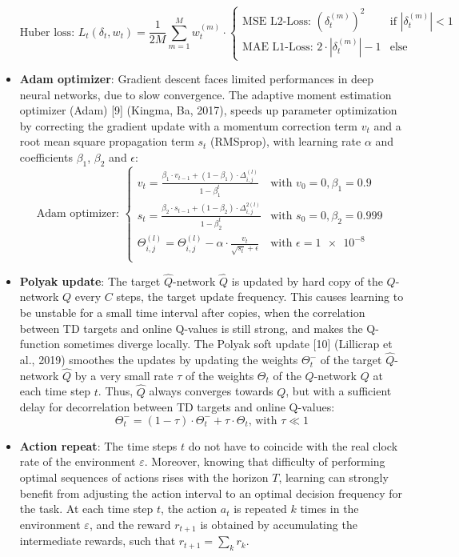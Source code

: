 \begin{itemize}
  \[ 
  \text{Huber loss: } L_t(\delta_t, w_t) = \frac{1}{2M}\sum_{m=1}^M w_t^{(m)} \cdot
  \begin{cases}
      \text{MSE L2-Loss: }(\delta_t^{(m)})^2 & \text{if } |\delta_t^{(m)}| < 1 \\
      \text{MAE L1-Loss: }2 \cdot |\delta_t^{(m)}| - 1 & \text{else}
  \end{cases}
  \]
  \item \textbf{Adam optimizer}: Gradient descent faces limited performances in deep neural networks, due to slow convergence. The adaptive moment estimation optimizer (Adam) [9] (Kingma, Ba, 2017), speeds up parameter optimization by correcting the gradient update with a momentum correction term $v_t$ and a root mean square propagation term $s_t$ (RMSprop), with learning rate $\alpha$ and coefficients $\beta_1$, $\beta_2$ and $\epsilon$:
  \[ 
  \text{Adam optimizer: } 
  \begin{cases}
      v_t = \frac{\beta_1 \cdot v_{t-1} + (1 - \beta_1) \cdot \Delta_{i,j}^{(l)}}{1-\beta_1^t} & \text{with } v_0=0, \beta_1 = 0.9\\
      s_t = \frac{\beta_2 \cdot s_{t-1} + (1 - \beta_2) \cdot \Delta_{i,j}^{2(l)}}{1-\beta_2^t} & \text{with } s_0=0, \beta_2 = 0.999\\
      \Theta_{i,j}^{(l)} = \Theta_{i,j}^{(l)} - \alpha \cdot \frac{v_t}{\sqrt{s_t} + \epsilon} & \text{with } \epsilon = \num{1e-8}\\
  \end{cases}
  \]
  \item \textbf{Polyak update}: The target $\hat{Q}$-network $\hat{Q}$ is updated by hard copy of the $Q$-network $Q$ every $C$ steps, the target update frequency. This causes learning to be unstable for a small time interval after copies, when the correlation between TD targets and online Q-values is still strong, and makes the Q-function sometimes diverge locally. The Polyak soft update [10] (Lillicrap et al., 2019) smoothes the updates by updating the weights $\Theta_t^-$ of the target $\hat{Q}$-network $\hat{Q}$ by a very small rate $\tau$ of the weights $\Theta_t$ of the $Q$-network $Q$ at each time step $t$. Thus, $\hat{Q}$ always converges towards $Q$, but with a sufficient delay for decorrelation between TD targets and online Q-values:
  \[ \Theta^-_t = (1-\tau) \cdot \Theta^-_t + \tau \cdot \Theta_t \text{, with } \tau \ll 1\]
  \item \textbf{Action repeat}: The time steps $t$ do not have to coincide with the real clock rate of the environment $\varepsilon$. Moreover, knowing that difficulty of performing optimal sequences of actions rises with the horizon $T$, learning can strongly benefit from adjusting the action interval to an optimal decision frequency for the task. At each time step $t$, the action $a_t$ is repeated $k$ times in the environment $\varepsilon$, and the reward $r_{t+1}$ is obtained by accumulating the intermediate rewards, such that $r_{t+1} = \sum_k r_k$.

\end{itemize}
